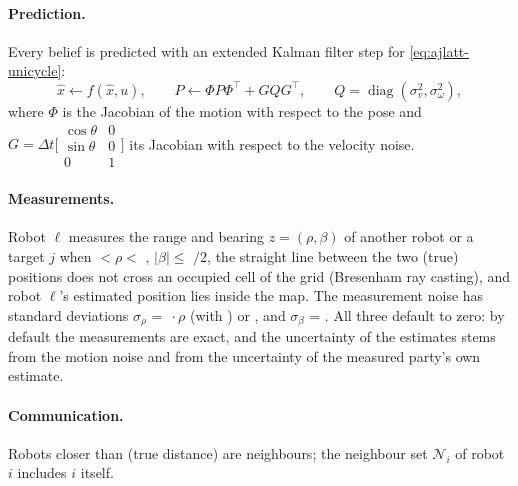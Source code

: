 \paragraph{Prediction.} Every belief is predicted with an extended Kalman filter
step for \eqref{eq:ajlatt-unicycle}:
\begin{equation}
  \hat x \leftarrow f(\hat x, u), \qquad
  P \leftarrow \Phi P \Phi^\top + G Q G^\top, \qquad
  Q = \operatorname{diag}(\sigma_v^2, \sigma_\omega^2),
\end{equation}
where $\Phi$ is the Jacobian of the motion with respect to the pose and
$G = \Delta t \bigl[\begin{smallmatrix} \cos\theta & 0 \\ \sin\theta & 0 \\ 0 & 1 \end{smallmatrix}\bigr]$
its Jacobian with respect to the velocity noise.

\paragraph{Measurements.} Robot $\ell$ measures the range and bearing
$z = (\rho, \beta)$ of another robot or a target $j$ when
 $< \rho <$ ,
$|\beta| \le$ $/2$, the straight line between the two (true)
positions does not cross an occupied cell of the grid (Bresenham ray casting),
and robot $\ell$'s estimated position lies inside the map. The measurement noise
has standard deviations $\sigma_\rho$ = $\,\cdot\rho$ (with
) or , and
$\sigma_\beta$ = . All three default to zero: by default the
measurements are exact, and the uncertainty of the estimates stems from the
motion noise and from the uncertainty of the measured party's own estimate.

\paragraph{Communication.} Robots closer than  (true
distance) are neighbours; the neighbour set $\mathcal{N}_i$ of robot $i$
includes $i$ itself.

